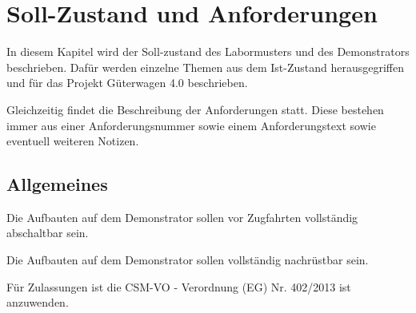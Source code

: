 \section{Soll-Zustand und Anforderungen}
In diesem Kapitel wird der Soll-zustand des Labormusters und des Demonstrators beschrieben. Dafür werden einzelne Themen aus dem Ist-Zustand herausgegriffen und für das Projekt Güterwagen 4.0 beschrieben.\par
Gleichzeitig findet die Beschreibung der Anforderungen statt. Diese bestehen immer aus einer Anforderungsnummer sowie einem Anforderungstext sowie eventuell weiteren Notizen.%

\subsection{Allgemeines}
\begin{feat}
Die Aufbauten auf dem Demonstrator sollen vor Zugfahrten vollständig abschaltbar sein.
\end{feat}
\begin{feat}
Die Aufbauten auf dem Demonstrator sollen vollständig nachrüstbar sein.
\end{feat}
\begin{feat}
Für Zulassungen ist die CSM-VO - Verordnung (EG) Nr. 402/2013 ist anzuwenden.
\end{feat}

